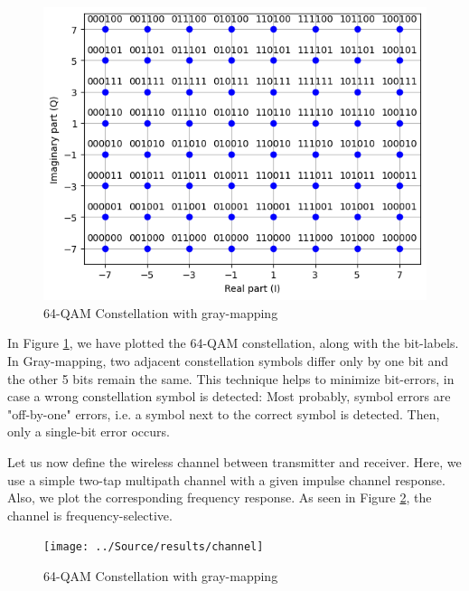 \begin{figure}[htbp]
    \centering
    \includegraphics[width=\textwidth]{../Source/results/mapping}
    \caption{64-QAM Constellation with gray-mapping}
    \label{mapping}
\end{figure}

In Figure \ref{mapping}, we have plotted the 64-QAM constellation, along with the bit-labels. In Gray-mapping, two adjacent constellation symbols differ only by one bit and the other 5 bits remain the same. This technique helps to minimize bit-errors, in case a wrong constellation symbol is detected: Most probably, symbol errors are "off-by-one" errors, i.e. a symbol next to the correct symbol is detected. Then, only a single-bit error occurs.

Let us now define the wireless channel between transmitter and receiver. Here, we use a simple two-tap multipath channel with a given impulse channel response. Also, we plot the corresponding frequency response. As seen in Figure \ref{channel}, the channel is frequency-selective.

\begin{figure}[htbp]
    \centering
    \texttt{[image: ../Source/results/channel]}
    \caption{64-QAM Constellation with gray-mapping}
    \label{channel}
\end{figure}

\newpage